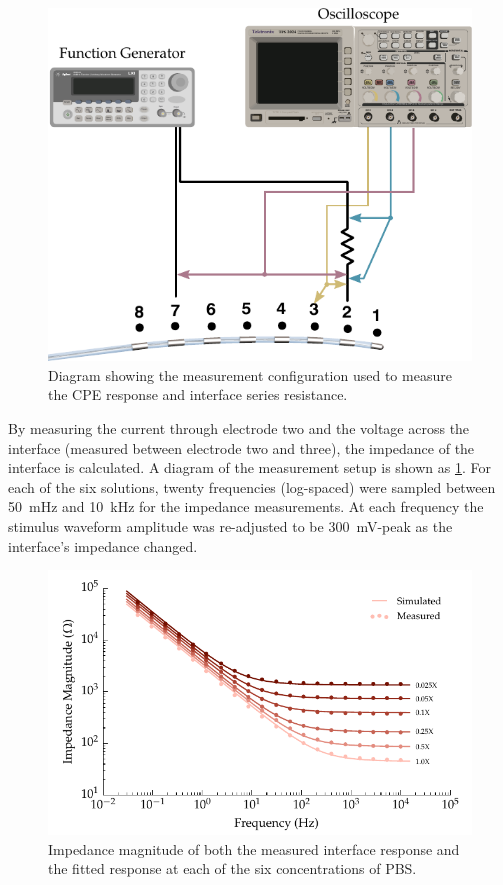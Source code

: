       \begin{figure}
          \centering
          \includegraphics[scale=0.95]{content/pt2/08-InterfaceParameters/graphics/measurement_CPE_setup}
          \caption{\label{fig:pt2-measurement_CPE_setup}Diagram showing the measurement configuration used to measure the CPE response and interface series resistance.}
      \end{figure}
      By measuring the current through electrode two and the voltage across the interface (measured between electrode two and three), the impedance of the interface is calculated.
      A diagram of the measurement setup is shown as \cref{fig:pt2-measurement_CPE_setup}.
      For each of the six solutions, twenty frequencies (log-spaced) were sampled between \SI{50}{\milli\hertz} and \SI{10}{\kilo\hertz} for the impedance measurements.
      At each frequency the stimulus waveform amplitude was re-adjusted to be \SI{300}{\milli\volt}-peak as the interface's impedance changed.
      \begin{figure}
        \centering
        \includegraphics{content/pt2/08-InterfaceParameters/graphics/displacement_impedanceVsFrequency_magnitude_thesis}
        \caption{\label{fig:pt2-graph_impedanceVsFrequency_magnitude}Impedance magnitude of both the measured interface response and the fitted response at each of the six concentrations of PBS.}
      \end{figure}
